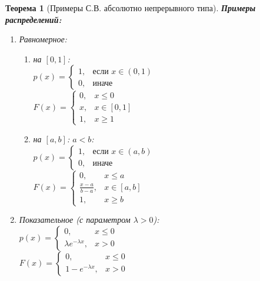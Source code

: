 \documentclass[14pt]{extarticle}
\theoremstyle{breakstyle}
\newtheorem{theorem}{Теорема}[subsection]
\begin{document}
\begin{theorem}[Примеры С.В. абсолютно непрерывного типа]

\textbf{Примеры распределений:}
\begin{enumerate}
    \item Равномерное:
        \begin{enumerate}
            \item на $[0, 1]$: \\
                  $p(x) = \begin{cases}
                        1, & \text{если } x \in (0, 1) \\
                        0, & \text{иначе}
                  \end{cases}$ \\
                  $F(x) = \begin{cases}
                        0, & x \leq 0 \\
                        x, & x \in [0, 1] \\
                        1, & x \geq 1
                  \end{cases}$
                  
            \item на $[a, b]$: $a < b$: \\
                  $p(x) = \begin{cases}
                        1, & \text{если } x \in (a, b) \\
                        0, & \text{иначе}
                  \end{cases}$ \\
                  $F(x) = \begin{cases}
                        0, & x \leq a \\
                        \frac{x-a}{b-a}, & x \in [a, b] \\
                        1, & x \geq b
                  \end{cases}$
        \end{enumerate}

    \item Показательное (с параметром $\lambda > 0$): \\
          $p(x) = \begin{cases}
                0, & x \leq 0 \\
                \lambda e^{-\lambda x}, & x > 0
          \end{cases}$ \\
          $F(x) = \begin{cases}
                0, & x \leq 0 \\
                1 - e^{-\lambda x}, & x > 0
          \end{cases}$
    

\end{enumerate}
\end{theorem}
\end{document}
